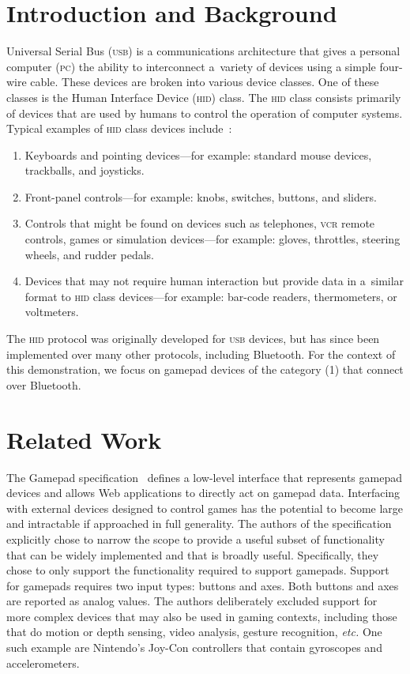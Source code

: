 \documentclass[sigconf]{acmart}
\begin{document}
\section{Introduction and Background}

Universal Serial Bus (\textsc{usb}) is a communications architecture
that gives a personal computer (\textsc{pc}) the ability to interconnect
a~variety of devices using a simple four-wire cable.
These devices are broken into various device classes.
One of these classes is the Human Interface Device (\textsc{hid}) class.
The \textsc{hid} class consists primarily of devices that are used by humans
to control the operation of computer systems.
Typical examples of \textsc{hid} class devices include~\cite{hid01}:

\begin{enumerate}
  \item Keyboards and pointing devices---for example: standard mouse devices,
        trackballs, and joysticks.
  \item Front-panel controls---for example: knobs, switches, buttons, and sliders.
  \item Controls that might be found on devices such as telephones, \textsc{vcr}
        remote controls, games or simulation devices---for example: gloves,
        throttles, steering wheels, and rudder pedals.
  \item Devices that may not require human interaction but provide data in a~similar
        format to \textsc{hid} class devices---for example: bar-code readers, 
        thermometers, or voltmeters.
\end{enumerate}

The \textsc{hid} protocol was originally developed for \textsc{usb} devices,
but has since been implemented over many other protocols, including Bluetooth.
For the context of this demonstration, we focus on gamepad devices of the category (1)
that connect over Bluetooth.

\section{Related Work}

The Gamepad specification~\cite{gamepad20} defines a low-level interface
that represents gamepad devices and allows Web applications
to directly act on gamepad data.
Interfacing with external devices designed to control games has the potential
to become large and intractable if approached in full generality.
The authors of the specification explicitly chose to narrow the scope
to provide a useful subset of functionality that can be widely implemented and
that is broadly useful.
Specifically, they chose to only support the functionality required to support gamepads.
Support for gamepads requires two input types: buttons and axes.
Both buttons and axes are reported as analog values.
The authors deliberately excluded support for more complex devices that may also be used
in gaming contexts, including those that do motion or depth sensing,
video analysis, gesture recognition, \textit{etc.}
One such example are Nintendo's Joy-Con controllers
that contain gyroscopes and accelerometers.
\end{document}
